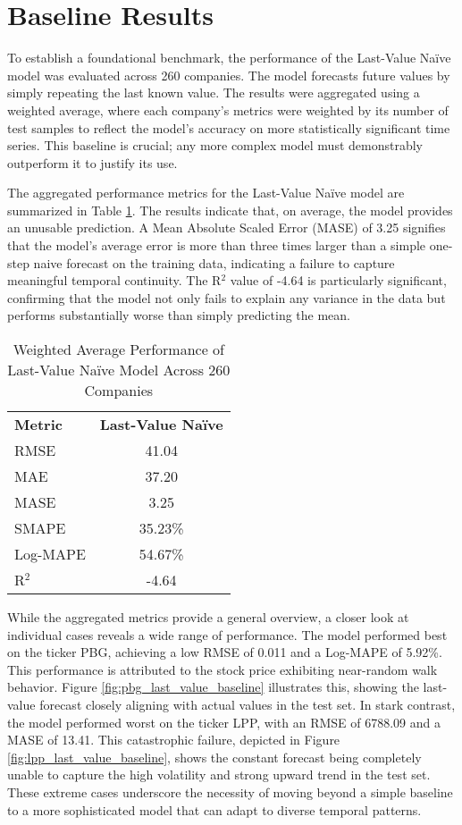 
\section{Baseline Results}

To establish a foundational benchmark, the performance of the Last-Value Naïve model was evaluated across 260 companies. The model forecasts future values by simply repeating the last known value. The results were aggregated using a weighted average, where each company's metrics were weighted by its number of test samples to reflect the model's accuracy on more statistically significant time series. This baseline is crucial; any more complex model must demonstrably outperform it to justify its use.

The aggregated performance metrics for the Last-Value Naïve model are summarized in Table \ref{tab:naive_model_performance}. The results indicate that, on average, the model provides an unusable prediction. A Mean Absolute Scaled Error (MASE) of 3.25 signifies that the model's average error is more than three times larger than a simple one-step naive forecast on the training data, indicating a failure to capture meaningful temporal continuity. The R$^2$ value of -4.64 is particularly significant, confirming that the model not only fails to explain any variance in the data but performs substantially worse than simply predicting the mean.

\begin{table}[h!]
\centering
\caption{Weighted Average Performance of Last-Value Naïve Model Across 260 Companies}
\label{tab:naive_model_performance}
\begin{tabular}{lc}
\textbf{Metric} & \textbf{Last-Value Naïve} \\
RMSE & 41.04 \\
MAE & 37.20 \\
MASE & 3.25 \\
SMAPE & 35.23\% \\
Log-MAPE & 54.67\% \\
R$^2$ & -4.64 \\
\end{tabular}
\end{table}

While the aggregated metrics provide a general overview, a closer look at individual cases reveals a wide range of performance. The model performed best on the ticker PBG, achieving a low RMSE of 0.011 and a Log-MAPE of 5.92\%. This performance is attributed to the stock price exhibiting near-random walk behavior. Figure \ref{fig:pbg_last_value_baseline} illustrates this, showing the last-value forecast closely aligning with actual values in the test set. In stark contrast, the model performed worst on the ticker LPP, with an RMSE of 6788.09 and a MASE of 13.41. This catastrophic failure, depicted in Figure \ref{fig:lpp_last_value_baseline}, shows the constant forecast being completely unable to capture the high volatility and strong upward trend in the test set. These extreme cases underscore the necessity of moving beyond a simple baseline to a more sophisticated model that can adapt to diverse temporal patterns.

